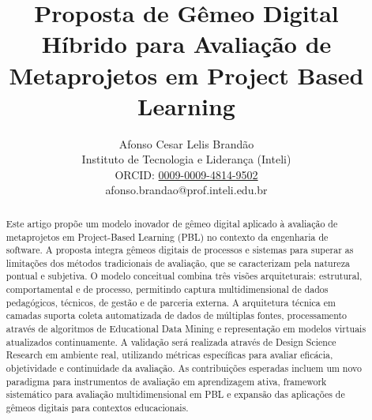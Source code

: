 \documentclass[english, spanish, brazilian]{RBIEarticle} %
\title{Proposta de Gêmeo Digital Híbrido para Avaliação de Metaprojetos em Project Based Learning}
\author{%
	\parbox{8cm}{%
		Afonso Cesar Lelis Brandão\\
		Instituto de Tecnologia e Liderança (Inteli)\\
		ORCID: \href{https://orcid.org/0009-0009-4814-9502}{0009-0009-4814-9502}\\
		afonso.brandao@prof.inteli.edu.br
	}
}
\begin{document}
\maketitle

\begin{otherlanguage}{brazilian}
  \begin{abstract}
    Este artigo propõe um modelo inovador de gêmeo digital aplicado à avaliação de metaprojetos em Project-Based Learning (PBL) no contexto da engenharia de software. A proposta integra gêmeos digitais de processos e sistemas para superar as limitações dos métodos tradicionais de avaliação, que se caracterizam pela natureza pontual e subjetiva. O modelo conceitual combina três visões arquiteturais: estrutural, comportamental e de processo, permitindo captura multidimensional de dados pedagógicos, técnicos, de gestão e de parceria externa. A arquitetura técnica em camadas suporta coleta automatizada de dados de múltiplas fontes, processamento através de algoritmos de Educational Data Mining e representação em modelos virtuais atualizados continuamente. A validação será realizada através de Design Science Research em ambiente real, utilizando métricas específicas para avaliar eficácia, objetividade e continuidade da avaliação. As contribuições esperadas incluem um novo paradigma para instrumentos de avaliação em aprendizagem ativa, framework sistemático para avaliação multidimensional em PBL e expansão das aplicações de gêmeos digitais para contextos educacionais.
  \end{abstract}
\end{otherlanguage}
\end{document}
